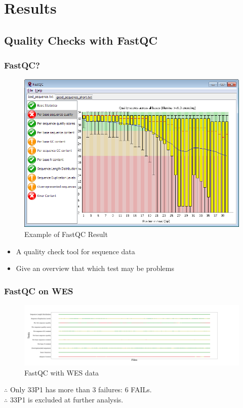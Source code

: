 \documentclass{beamer}
\begin{document}
    \section{Results}
    \subsection{Quality Checks with FastQC}
    \begin{frame}
        \frametitle{FastQC?}

        \begin{figure}
            \includegraphics[width=0.5 \linewidth]{figures/FastQC/example.png}
            \caption{Example of FastQC Result \protect\cite{fastqc1}}
        \end{figure}

        \begin{itemize}
            \item A quality check tool for sequence data
            \item Give an overview that which test may be problems
        \end{itemize}
    \end{frame}

    \begin{frame}
        \frametitle{FastQC on WES}

        \begin{figure}
            \includegraphics[width=\linewidth]{figures/FastQC/FastQC_WES.pdf}
            \caption{FastQC with WES data}
        \end{figure}

        $\therefore$ Only 33P1 has more than 3 failures: 6 FAILs. \\
        $\therefore$ 33P1 is excluded at further analysis.
    \end{frame}
\end{document}
